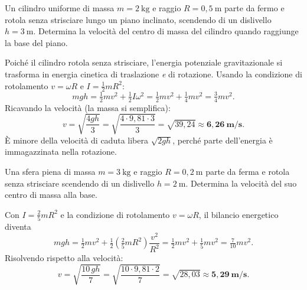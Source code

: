 
\begin{question}[ID=5.1, subtitle={Cilindro che rotola senza strisciare giù per un piano inclinato}, tags={corpo rigido, rotolamento, cilindro}, difficulty=media]
Un cilindro uniforme di massa $m = 2\ \text{kg}$ e raggio $R = 0{,}5\ \text{m}$ parte da fermo e rotola senza strisciare lungo un piano inclinato, scendendo di un dislivello $h = 3\ \text{m}$. Determina la velocità del centro di massa del cilindro quando raggiunge la base del piano.
\begin{solution}
Poiché il cilindro rotola senza strisciare, l'energia potenziale gravitazionale si trasforma in energia cinetica di traslazione \emph{e} di rotazione. Usando la condizione di rotolamento $v = \omega R$ e $I = \tfrac{1}{2}mR^2$:
\[
mgh = \tfrac{1}{2}mv^2 + \tfrac{1}{2}I\omega^2 = \tfrac{1}{2}mv^2 + \tfrac{1}{4}mv^2 = \tfrac{3}{4}mv^2.
\]
Ricavando la velocità (la massa si semplifica):
\[
v = \sqrt{\frac{4gh}{3}} = \sqrt{\frac{4\cdot 9{,}81\cdot 3}{3}} = \sqrt{39{,}24} \approx \mathbf{6{,}26\ \text{m/s}}.
\]
È minore della velocità di caduta libera $\sqrt{2gh}$, perché parte dell'energia è immagazzinata nella rotazione.
\end{solution}
\end{question}


\begin{question}[ID=5.2, subtitle={Sfera piena che rotola senza strisciare da h = 2 m}, tags={corpo rigido, rotolamento, sfera}, difficulty=media]
Una sfera piena di massa $m = 3\ \text{kg}$ e raggio $R = 0{,}2\ \text{m}$ parte da ferma e rotola senza strisciare scendendo di un dislivello $h = 2\ \text{m}$. Determina la velocità del suo centro di massa alla base.
\begin{solution}
Con $I = \tfrac{2}{5}mR^2$ e la condizione di rotolamento $v = \omega R$, il bilancio energetico diventa
\[
mgh = \tfrac{1}{2}mv^2 + \tfrac{1}{2}\!\left(\tfrac{2}{5}mR^2\right)\!\frac{v^2}{R^2} = \tfrac{1}{2}mv^2 + \tfrac{1}{5}mv^2 = \tfrac{7}{10}mv^2.
\]
Risolvendo rispetto alla velocità:
\[
v = \sqrt{\frac{10\,gh}{7}} = \sqrt{\frac{10\cdot 9{,}81\cdot 2}{7}} = \sqrt{28{,}03} \approx \mathbf{5{,}29\ \text{m/s}}.
\]
\end{solution}
\end{question}

